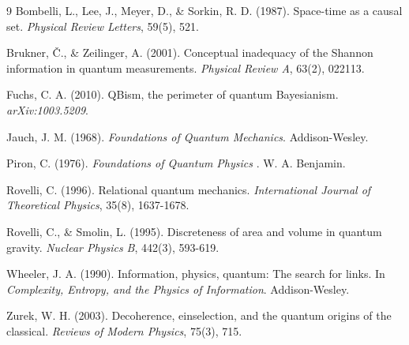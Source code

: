 \documentclass[aps,preprint,showpacs,showkeys]{revtex4}
\begin{document}
\begin{thebibliography}{9}
 Bombelli, L., Lee, J., Meyer, D., \& Sorkin, R. D.
(1987). Space-time as a causal set. \textit{Physical Review Letters}, 59(5),
521.

 Brukner, \v{C}., \& Zeilinger, A. (2001). Conceptual
inadequacy of the Shannon information in quantum measurements. \textit{%
Physical Review A}, 63(2), 022113.

 Fuchs, C. A. (2010). QBism, the perimeter of quantum
Bayesianism. \textit{arXiv:1003.5209}.

 Jauch, J. M. (1968). \textit{Foundations of Quantum
Mechanics}. Addison-Wesley.

 Piron, C. (1976). \textit{Foundations of Quantum Physics}%
. W. A. Benjamin.

 Rovelli, C. (1996). Relational quantum mechanics. 
\textit{International Journal of Theoretical Physics}, 35(8), 1637-1678.

 Rovelli, C., \& Smolin, L. (1995). Discreteness of
area and volume in quantum gravity. \textit{Nuclear Physics B}, 442(3),
593-619.

 Wheeler, J. A. (1990). Information, physics, quantum:
The search for links. In \textit{Complexity, Entropy, and the Physics of
Information}. Addison-Wesley.

 Zurek, W. H. (2003). Decoherence, einselection, and the
quantum origins of the classical. \textit{Reviews of Modern Physics}, 75(3),
715.
\end{thebibliography}
\end{document}

